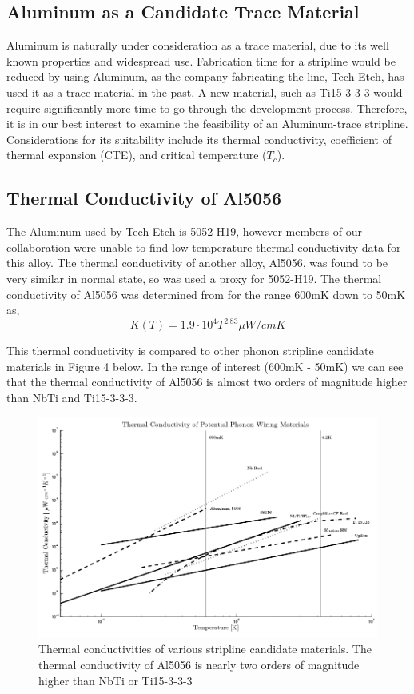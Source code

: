 \documentclass{report}
\begin{document}
\begin{appendices}
\restoregeometry

\chapter{Aluminum as a Candidate Trace Material}

Aluminum is naturally under consideration as a trace material, due to its well known properties and widespread use. Fabrication time for a stripline would be reduced by using Aluminum, as the company fabricating the line, Tech-Etch, has used it as a trace material in the past. A new material, such as Ti15-3-3-3 would require significantly more time to go through the development process. Therefore, it is in our best interest to examine the feasibility of an Aluminum-trace stripline. Considerations for its suitability include its thermal conductivity, coefficient of thermal expansion (CTE), and critical temperature ($T_{c}$).

\section{Thermal Conductivity of Al5056}

The Aluminum used by Tech-Etch is 5052-H19, however members of our collaboration were unable to find low temperature thermal conductivity data for this alloy. The thermal conductivity of another alloy, Al5056, was found to be very similar in normal state, so was used a proxy for 5052-H19. The thermal conductivity of Al5056 was determined from \cite{coc} for the range 600mK down to 50mK as,
\begin{equation}
K(T) = 1.9 \cdot 10^{4} T^{2.83} \mu W/cmK
\end{equation}

This thermal conductivity is compared to other phonon stripline candidate materials in Figure 4 below. In the range of interest (600mK - 50mK) we can see that the thermal conductivity of Al5056 is almost two orders of magnitude higher than NbTi and Ti15-3-3-3.

\begin{figure}[h]
\includegraphics[width = .87\textwidth]{Cable_Therm_Graph.png}
\caption{Thermal conductivities of various stripline candidate materials. The thermal conductivity of Al5056 is nearly two orders of magnitude higher than NbTi or Ti15-3-3-3}
\end{figure}



\end{appendices}
\end{document}
